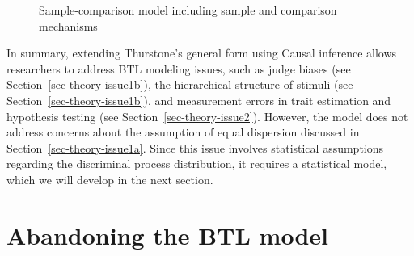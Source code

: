 \documentclass[
  authoryear,
  review,
  1p]{elsarticle}
\begin{document}
\begin{figure}[H]
\begin{minipage}{\linewidth}
{}


\end{minipage}%

\caption{\label{fig-cj14}Sample-comparison model including sample and
comparison mechanisms}

\end{figure}%

In summary, extending Thurstone's general form using Causal inference
allows researchers to address BTL modeling issues, such as judge biases
(see Section~\ref{sec-theory-issue1b}), the hierarchical structure of
stimuli (see Section~\ref{sec-theory-issue1b}), and measurement errors
in trait estimation and hypothesis testing (see
Section~\ref{sec-theory-issue2}). However, the model does not address
concerns about the assumption of equal dispersion discussed in
Section~\ref{sec-theory-issue1a}. Since this issue involves statistical
assumptions regarding the discriminal process distribution, it requires
a statistical model, which we will develop in the next section.

\section{Abandoning the BTL model}\label{sec-statistical}
\end{document}
